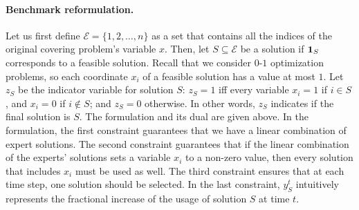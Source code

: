 \paragraph{Benchmark reformulation.} Let us first define $\mathcal{E} = \{1,2,\dots,n\}$ as a set that contains all the indices of the original covering problem's variable $x$. Then, let $S \subseteq \mathcal{E}$ be a solution if $\mathbf{1}_{S}$ corresponds to a feasible solution. Recall that we consider $0$-$1$ optimization problems, so each coordinate $x_i$ of a feasible solution has a value at most $1$. Let $z_{S}$ be the indicator variable for solution $S$: $z_{S} = 1$ iff every variable $x_{i} = 1$ if $i \in S$, and $x_{i} = 0$ if $i \notin S$; and $z_S = 0$ otherwise. In other words, $z_{S}$ indicates if the final solution is $S$. The formulation and its dual are given above. In the formulation, 
the first constraint guarantees that we have a linear combination of expert solutions. 
The second constraint guarantees that if the linear combination of the experts' solutions sets a variable $x_i$ to a non-zero value, then every solution that includes $x_i$ must be used as well. The third constraint ensures that at each time step, one solution should be selected. In the last constraint, 
$y_S^{t}$ intuitively represents the fractional increase of the usage of solution $S$ at time $t$. 




